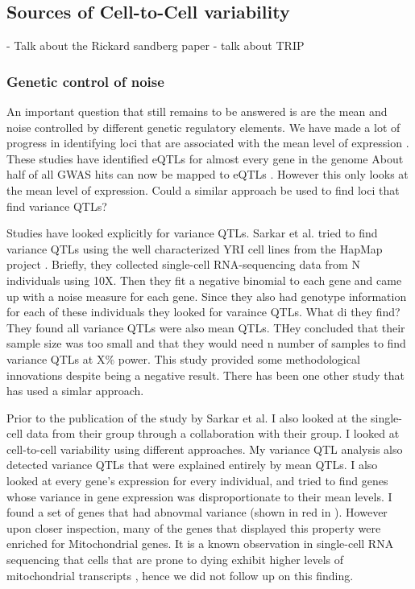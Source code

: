 \subsection{Sources of Cell-to-Cell variability}
- Talk about the Rickard sandberg paper
- talk about TRIP

\subsubsection{Genetic control of noise}
An important question that still remains to be answered is are the mean and noise controlled by different genetic regulatory elements.
We have made a lot of progress in identifying loci that are associated with the mean level of expression \cite{gtex_consortium_genetic_2017-1} \cite{eqtlgen} \cite{more}. These studies have identified eQTLs for almost every gene in the genome \cite{} About half of all GWAS hits can now be mapped to eQTLs \cite{}. However this only looks at the mean level of expression. Could a similar approach be used to find loci that find variance QTLs?

Studies have looked explicitly for variance QTLs. Sarkar et al. tried to find variance QTLs using the well characterized YRI cell lines from the HapMap project \cite{hapmap}. Briefly, they collected single-cell RNA-sequencing data from N individuals using 10X. Then they fit a negative binomial to each gene and came up with a noise measure for each gene. Since they also had genotype information for each of these individuals they looked for varaince QTLs. What di they find? They found all variance QTLs were also mean QTLs. THey concluded that their sample size was too small and that they would need n number of samples to find variance QTLs at X\% power. This study provided some methodological innovations despite being a negative result. There has been one other study that has used a simlar approach.

Prior to the publication of the study by Sarkar et al. I also looked at the single-cell data from their group through a collaboration with their group. I looked at cell-to-cell variability using different approaches. My variance QTL analysis also detected variance QTLs that were explained entirely by mean QTLs. I also looked at every gene's expression for every individual, and tried to find genes whose variance in gene expression was disproportionate to their mean levels. I found a set of genes that had abnovmal variance (shown in red in ). However upon closer inspection, many of the genes that displayed this property were enriched for Mitochondrial genes. It is a known observation in single-cell 
RNA sequencing that cells that are prone to dying exhibit higher levels of mitochondrial transcripts \cite {seurat}, hence we did not follow up on this finding.

